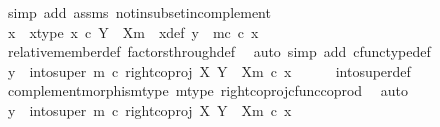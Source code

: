 \begin{isabellebody}
\ {\isacharparenleft}{\kern0pt}simp\ add{\isacharcolon}{\kern0pt}\ assms\ not{\isacharunderscore}{\kern0pt}in{\isacharunderscore}{\kern0pt}subset{\isacharunderscore}{\kern0pt}in{\isacharunderscore}{\kern0pt}complement{\isacharparenright}{\kern0pt}\isanewline
\ \ \isamarkupfalse%
\ \isamarkupfalse%
\ x\ \ x{\isacharunderscore}{\kern0pt}type{\isacharcolon}{\kern0pt}\ {\isachardoublequoteopen}x\ {\isasymin}\isactrlsub c\ Y\ {\isasymsetminus}\ {\isacharparenleft}{\kern0pt}X{\isacharcomma}{\kern0pt}m{\isacharparenright}{\kern0pt}{\isachardoublequoteclose}\ \ x{\isacharunderscore}{\kern0pt}def{\isacharcolon}{\kern0pt}\ {\isachardoublequoteopen}y\ {\isacharequal}{\kern0pt}\ m\isactrlsup c\ {\isasymcirc}\isactrlsub c\ x{\isachardoublequoteclose}\isanewline
\ \ \ \ \isamarkupfalse%
\ relative{\isacharunderscore}{\kern0pt}member{\isacharunderscore}{\kern0pt}def{}\ factors{\isacharunderscore}{\kern0pt}through{\isacharunderscore}{\kern0pt}def\ \isamarkupfalse%
\ {\isacharparenleft}{\kern0pt}auto\ simp\ add{\isacharcolon}{\kern0pt}\ cfunc{\isacharunderscore}{\kern0pt}type{\isacharunderscore}{\kern0pt}def{\isacharparenright}{\kern0pt}\isanewline
\ \ \isamarkupfalse%
\ \isamarkupfalse%
\ {\isachardoublequoteopen}y\ {\isacharequal}{\kern0pt}\ {\isacharparenleft}{\kern0pt}into{\isacharunderscore}{\kern0pt}super\ m\ {\isasymcirc}\isactrlsub c\ right{\isacharunderscore}{\kern0pt}coproj\ X\ {\isacharparenleft}{\kern0pt}Y\ {\isasymsetminus}\ {\isacharparenleft}{\kern0pt}X{\isacharcomma}{\kern0pt}m{\isacharparenright}{\kern0pt}{\isacharparenright}{\kern0pt}{\isacharparenright}{\kern0pt}\ {\isasymcirc}\isactrlsub c\ x{\isachardoublequoteclose}\isanewline
\ \ \ \ \isamarkupfalse%
\ into{\isacharunderscore}{\kern0pt}super{\isacharunderscore}{\kern0pt}def\ \isamarkupfalse%
\ complement{\isacharunderscore}{\kern0pt}morphism{\isacharunderscore}{\kern0pt}type\ m{\isacharunderscore}{\kern0pt}type\ right{\isacharunderscore}{\kern0pt}coproj{\isacharunderscore}{\kern0pt}cfunc{\isacharunderscore}{\kern0pt}coprod\ \isamarkupfalse%
\ auto\ \isanewline
\ \ \isamarkupfalse%
\ \isamarkupfalse%
\ {\isachardoublequoteopen}y\ {\isacharequal}{\kern0pt}\ into{\isacharunderscore}{\kern0pt}super\ m\ {\isasymcirc}\isactrlsub c\ right{\isacharunderscore}{\kern0pt}coproj\ X\ {\isacharparenleft}{\kern0pt}Y\ {\isasymsetminus}\ {\isacharparenleft}{\kern0pt}X{\isacharcomma}{\kern0pt}m{\isacharparenright}{\kern0pt}{\isacharparenright}{\kern0pt}\ {\isasymcirc}\isactrlsub c\ x{\isachardoublequoteclose}\isanewline

\end{isabellebody}
